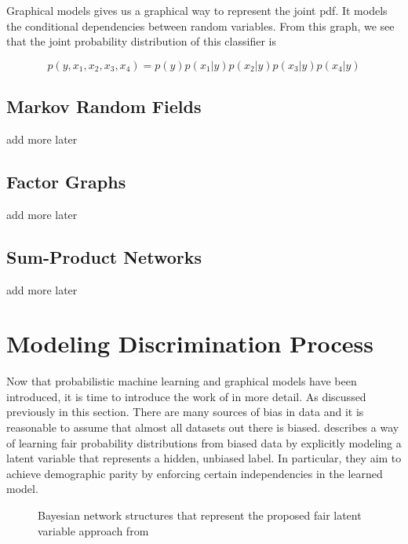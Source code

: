 Graphical models gives us a graphical way to represent the joint pdf. It models the conditional dependencies between random variables. From this graph, we see that the joint probability distribution of this classifier is

\begin{equation}
    p(y, x_1, x_2, x_3, x_4) = p(y)p(x_1|y)p(x_2|y)p(x_3|y)p(x_4|y)
\end{equation}

\subsection{Markov Random Fields}

add more later

\subsection{Factor Graphs}

add more later

\subsection{Sum-Product Networks}

add more later

\section{Modeling Discrimination Process}

Now that probabilistic machine learning and graphical models have been introduced, it is time to introduce the work of \citet{Choi:2021:AIII} in more detail. As discussed previously in this section. There are many sources of bias in data and it is reasonable to assume that almost all datasets out there is biased. \citet{Choi:2021:AIII} describes a way of learning fair probability distributions from biased data by explicitly modeling a latent variable that represents a hidden, unbiased label. In particular, they aim to achieve demographic parity by enforcing
certain independencies in the learned model.

\begin{figure}[h!]
    \centering
    \caption{Bayesian network structures that represent the proposed
fair latent variable approach from \cite{Choi:2021:AIII}}
    \label{fig:choinetwork}
\end{figure}

